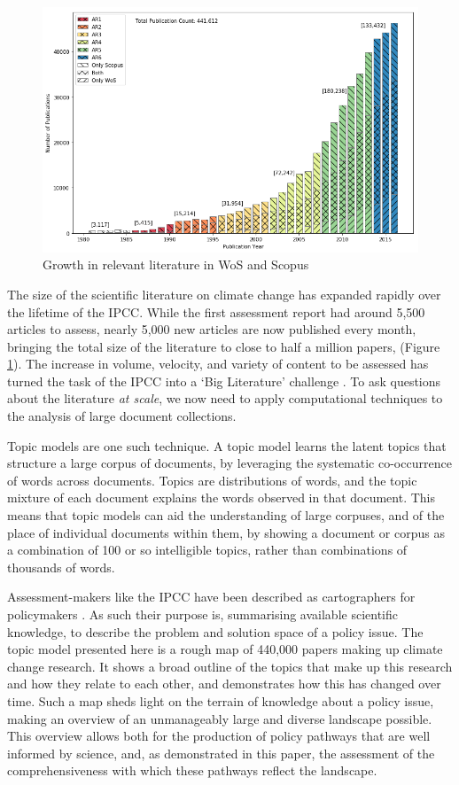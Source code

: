 \documentclass{article}
\begin{document}
\begin{figure}
\begin{center}
	\includegraphics[width=0.8\linewidth]{plots/wos_scopus_docs_time}
    \caption{Growth in relevant literature in WoS and Scopus}
    \label{growth}
    \end{center}
\end{figure}

The size of the scientific literature on climate change has expanded rapidly over the lifetime of the IPCC. While the first assessment report had around 5,500 articles to assess, nearly 5,000 new articles are now published every month, bringing the total size of the literature to close to half a million papers, (Figure \ref{growth}).  The increase in volume, velocity, and variety of content to be assessed has turned the task of the IPCC into a `Big Literature' challenge \citep{Minx2017b}. To ask questions about the literature \textit{at scale}, we now need to apply computational techniques to the analysis of large document collections.

Topic models are one such technique. A topic model learns the latent topics that structure a large corpus of documents, by leveraging the systematic co-occurrence of words across documents. Topics are distributions of words, and the topic mixture of each document explains the words observed in that document. This means that topic models can aid the understanding of large corpuses, and of the place of individual documents within them, by showing a document or corpus as a combination of 100 or so intelligible topics, rather than combinations of thousands of words.

Assessment-makers like the IPCC have been described as cartographers for policymakers \citep{Edenhofer2015}. As such their purpose is, summarising available scientific knowledge, to describe the problem and solution space of a policy issue. The topic model presented here is a rough map of 440,000 papers making up climate change research. It shows a broad outline of the topics that make up this research and how they relate to each other, and demonstrates how this has changed over time. Such a map sheds light on the terrain of knowledge about a policy issue, making an overview of an unmanageably large and diverse landscape possible. This overview allows both for the production of policy pathways that are well informed by science, and, as demonstrated in this paper, the assessment of the comprehensiveness with which these pathways reflect the landscape.
\end{document}
